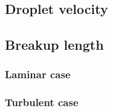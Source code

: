 \documentclass[ccbysa,note]{bmtreport}
\begin{document}
\subsection{Droplet velocity}

\subsection{Breakup length}

\subsubsection{Laminar case}

\subsubsection{Turbulent case}



\printbibliography[notcategory=ignore]
\end{document}
